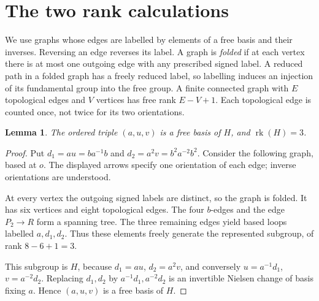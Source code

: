 \documentclass[11pt,a4paper]{article}
\newtheorem{lemma}[theorem]{Lemma}
\newcommand{\rk}{\operatorname{rk}}
\begin{document}
\section{The two rank calculations}
We use graphs whose edges are labelled by elements of a free basis and their inverses. Reversing an edge reverses its label. A graph is \emph{folded} if at each vertex there is at most one outgoing edge with any prescribed signed label. A reduced path in a folded graph has a freely reduced label, so labelling induces an injection of its fundamental group into the free group. A finite connected graph with $E$ topological edges and $V$ vertices has free rank $E-V+1$. Each topological edge is counted once, not twice for its two orientations.

\begin{lemma}\label{lem:H}
The ordered triple $(a,u,v)$ is a free basis of $H$, and $\rk(H)=3$.
\end{lemma}
\begin{proof}
Put $d_1=au=ba^{-1}b$ and $d_2=a^2v=b^2a^{-2}b^2$. Consider the following graph, based at $o$. The displayed arrows specify one orientation of each edge; inverse orientations are understood.
\begin{center}
\end{center}
At every vertex the outgoing signed labels are distinct, so the graph is folded. It has six vertices and eight topological edges. The four $b$-edges and the edge $P_2\to R$ form a spanning tree. The three remaining edges yield based loops labelled $a,d_1,d_2$. Thus these elements freely generate the represented subgroup, of rank $8-6+1=3$.

This subgroup is $H$, because $d_1=au$, $d_2=a^2v$, and conversely $u=a^{-1}d_1$, $v=a^{-2}d_2$. Replacing $d_1,d_2$ by $a^{-1}d_1,a^{-2}d_2$ is an invertible Nielsen change of basis fixing $a$. Hence $(a,u,v)$ is a free basis of $H$.
\end{proof}
\end{document}
